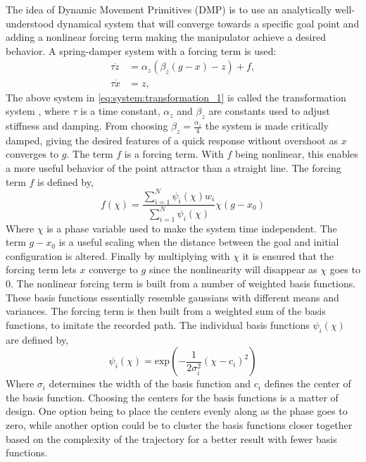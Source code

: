 \documentclass[../main.tex]{subfiles}
\begin{document}
The idea of Dynamic Movement Primitives (DMP) is to use an analytically well-understood dynamical system that will converge towards a specific goal point \cite{ijspeert_dynamical_2013} and adding a nonlinear forcing term making the manipulator achieve a desired behavior. A spring-damper system with a forcing term is used:
\begin{align} \label{eq:system:transformation_1}
    \tau \dot{z} &= \alpha_z  (\beta_z ( g - x ) - z ) + f,\\
    \tau \dot{x} &= z,\label{eq:system:transformation_2}
\end{align}
The above system in \autoref{eq:system:transformation_1} is called the transformation system \cite{ijspeert_dynamical_2013}, where $\tau$ is a time constant, $\alpha_z$ and $\beta_z$ are constants used to adjust stiffness and damping. From \cite{ijspeert_dynamical_2013} choosing $\beta_z = \frac{\alpha_z}{4}$ the system is made critically damped, giving the desired features of a quick response without overshoot as $x$ converges to $g$.
The term $f$ is a forcing term. With $f$ being nonlinear, this enables a more useful behavior of the point attractor than a straight line. The forcing term $f$ is defined by,
\begin{equation} \label{eq:forcing}
    f(\chi) = \frac{\sum_{i=1}^{N} \psi_i(\chi) w_i}{\sum_{i=1}^{N} \psi_i(\chi)} \chi (g-x_0)
\end{equation}
Where $\chi$ is a phase variable used to make the system time independent. The term $g-x_0$ is a useful scaling when the distance between the goal and initial configuration is altered.
Finally by multiplying with $\chi$ it is ensured that the forcing term lets $x$ converge to $g$ since the nonlinearity will disappear as $\chi$ goes to $0$. %
The nonlinear forcing term is built from a number of weighted basis functions. These basis functions essentially resemble gaussians with different means and variances. The forcing term is then built from a weighted sum of the basis functions, to imitate the recorded path. The individual basis functions $\psi_i(\chi)$ are defined by,
\begin{equation}
    \psi_i(\chi) = \text{exp}\left(-\frac{1}{2\sigma_i^2}(\chi-c_i)^2\right)
\end{equation}
Where $\sigma_i$ determines the width of the basis function and $c_i$ defines the center of the basis function. Choosing the centers for the basis functions is a matter of design. One option being to place the centers evenly along as the phase goes to zero, while another option could be to cluster the basis functions closer together based on the complexity of the trajectory for a better result with fewer basis functions.
\end{document}
